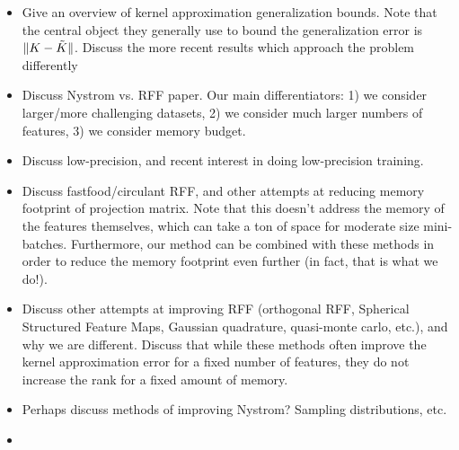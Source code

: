 \begin{itemize}
	\item Give an overview of kernel approximation generalization bounds.  Note that the central object they generally use to bound the generalization error is $\|K-\tilde{K}\|$.  Discuss the more recent results which approach the problem differently 
	\item Discuss Nystrom vs. RFF paper.  Our main differentiators: 1) we consider larger/more challenging datasets, 2) we consider much larger numbers of features, 3) we consider memory budget.
	\item Discuss low-precision, and recent interest in doing low-precision training.
	\item Discuss fastfood/circulant RFF, and other attempts at reducing memory footprint of projection matrix.  Note that this doesn't address the memory of the features themselves, which can take a ton of space for moderate size mini-batches. Furthermore, our method can be combined with these methods in order to reduce the memory footprint even further (in fact, that is what we do!).
	\item Discuss other attempts at improving RFF (orthogonal RFF, Spherical Structured Feature Maps, Gaussian quadrature, quasi-monte carlo, etc.), and why we are different.  Discuss that while these methods often improve the kernel approximation error for a fixed number of features, they do not increase the rank for a fixed amount of memory.
	\item Perhaps discuss methods of improving Nystrom?  Sampling distributions, etc.
	\item {}
\end{itemize}
